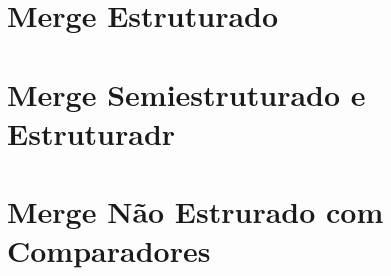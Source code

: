 \section{Merge Estruturado}
\section{Merge Semiestruturado e Estruturadr}
\section{Merge Não Estrurado com Comparadores}
